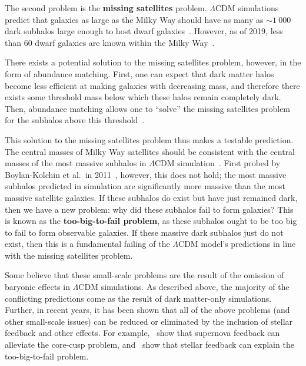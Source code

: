 The second problem is the \textbf{missing satellites} problem.  $\Lambda$CDM
simulations predict that galaxies as large as the Milky Way should have as
many as \(\sim 1~000\) dark subhalos large enough to host dwarf
galaxies~\cite{bullock_small-scale_2017}.  However, as of 2019, less than 60
dwarf galaxies are known within the Milky Way~\cite{simon_faintest_2019}.

There exists a potential solution to the missing satellites problem,
however, in the form of abundance matching. First, one can expect that
dark matter halos become less efficient at making galaxies with
decreasing mass, and therefore there exists some threshold mass below
which these halos remain completely dark. Then, abundance matching
allows one to ``solve'' the missing satellites problem for the subhalos
above this threshold~\cite{bullock_small-scale_2017}.

This solution to the missing satellites problem thus makes a testable
prediction. The central masses of Milky Way satellites should be
consistent with the central masses of the most massive subhalos in
\(\Lambda\)CDM simulation~\cite{bullock_small-scale_2017}. First
probed by Boylan-Kolchin et al.~in 2011~\cite{boylan-kolchin_too_2011},
however, this does not hold; the most massive subhalos predicted in simulation
are significantly more massive than the most massive satellite galaxies.  If
these subhalos do exist but have just remained dark, then we have a new
problem: why did these subhalos fail to form galaxies?  This is known as the
\textbf{too-big-to-fail problem}, as these subhalos ought to be too big to
fail to form observable galaxies.  If these massive dark subhalos just do not
exist, then this is a fundamental failing of the \(\Lambda\)CDM model's
predictions in line with the missing satellites problem.

Some believe that these small-scale problems are the result of the omission of
baryonic effects in \(\Lambda\)CDM simulations. As described above, the
majority of the conflicting predictions come as the result of dark matter-only
simulations. Further, in recent years, it has been shown that all of the above
problems (and other small-scale issues) can be reduced or eliminated by the
inclusion of stellar feedback and other effects. For example,~\cite{pontzen_how_2012} show that supernova feedback can alleviate the core-cusp
problem, and~\cite{chan_impact_2015} show that stellar feedback can explain
the too-big-to-fail problem.

